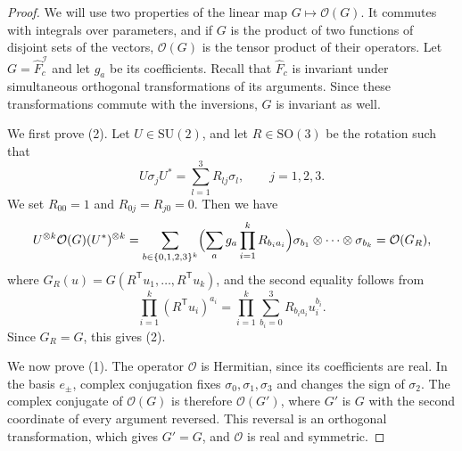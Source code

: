 \begin{proof}
We will use two properties of the linear map $G \mapsto \mathcal O(G)$. It commutes with integrals over parameters, and if $G$ is the product of two functions of disjoint sets of the vectors, $\mathcal O(G)$ is the tensor product of their operators. Let $G = \hat F_c^{\mathcal I}$ and let $g_a$ be its coefficients. Recall that $\hat F_c$ is invariant under simultaneous orthogonal transformations of its arguments. Since these transformations commute with the inversions, $G$ is invariant as well.

We first prove (2). Let $U \in \mathrm{SU}(2)$, and let $R \in \mathrm{SO}(3)$ be the rotation such that
\begin{equation*}
U \sigma_j U^* = \sum_{l = 1}^3 R_{lj} \sigma_l, \qquad j = 1, 2, 3 .
\end{equation*}
We set $R_{00} = 1$ and $R_{0j} = R_{j0} = 0$. Then we have
\begin{equation*}
U^{\otimes k} \mathcal O(G) (U^*)^{\otimes k} = \sum_{b \in \{0, 1, 2, 3\}^k} \Bigl( \sum_a g_a \prod_{i = 1}^k R_{b_i a_i} \Bigr) \sigma_{b_1} \otimes \cdots \otimes \sigma_{b_k} = \mathcal O(G_R),
\end{equation*}
where $G_R(u) = G(R^{\mathsf T} u_1, \dots, R^{\mathsf T} u_k)$, and the second equality follows from
\begin{equation*}
\prod_{i = 1}^k (R^{\mathsf T} u_i)^{a_i} = \prod_{i = 1}^k \sum_{b_i = 0}^3 R_{b_i a_i} u_i^{b_i} .
\end{equation*}
Since $G_R = G$, this gives (2).

We now prove (1). The operator $\mathcal O$ is Hermitian, since its coefficients are real. In the basis $e_\pm$, complex conjugation fixes $\sigma_0, \sigma_1, \sigma_3$ and changes the sign of $\sigma_2$. The complex conjugate of $\mathcal O(G)$ is therefore $\mathcal O(G')$, where $G'$ is $G$ with the second coordinate of every argument reversed. This reversal is an orthogonal transformation, which gives $G' = G$, and $\mathcal O$ is real and symmetric.


\end{proof}
